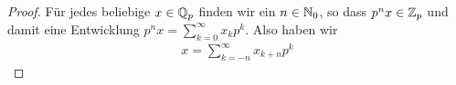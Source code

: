 \begin{proof}
		Für jedes beliebige $x\in \mathbb{Q}_p$ finden wir ein $n\in\mathbb{N}_0$, so dass $p^{n}x \in {\mathbb{Z}_p}$ und damit eine Entwicklung $p^{n}x = \sum_{k=0}^{\infty} x_kp^k$. Also haben wir 
		\begin{align*}
			x = \sum_{k=-n}^{\infty} x_{k+n}p^k
		\end{align*}
	\end{proof}